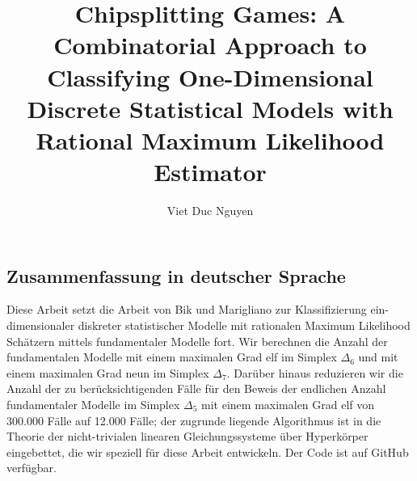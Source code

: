 \documentclass[masters]{ucbthesis}
\numberwithin{algorithm}{chapter} %
\theoremstyle{definition}
\begin{document}

\title{Chipsplitting Games: A Combinatorial Approach to Classifying One-Dimensional Discrete Statistical Models with Rational Maximum Likelihood Estimator}
\author{Viet Duc Nguyen}


\maketitle
\copyrightpage

\begin{alwayssingle}
\section*{Zusammenfassung in deutscher Sprache}

Diese Arbeit setzt die Arbeit von Bik und Marigliano zur Klassifizierung ein-dimensionaler diskreter statistischer Modelle mit rationalen Maximum Likelihood Schätzern mittels fundamentaler Modelle fort. Wir berechnen die Anzahl der fundamentalen Modelle mit einem maximalen Grad elf im Simplex \( \Delta_6 \) und mit einem maximalen Grad neun im Simplex \( \Delta_7 \). Darüber hinaus reduzieren wir die Anzahl der zu berücksichtigenden Fälle für den Beweis der endlichen Anzahl fundamentaler Modelle im Simplex \( \Delta_5 \) mit einem maximalen Grad elf von 300.000 Fälle auf 12.000 Fälle; der zugrunde liegende Algorithmus ist in die Theorie der nicht-trivialen linearen Gleichungssysteme über Hyperkörper eingebettet, die wir speziell für diese Arbeit entwickeln. Der Code ist auf GitHub verfügbar.

\end{alwayssingle}
\end{document}
